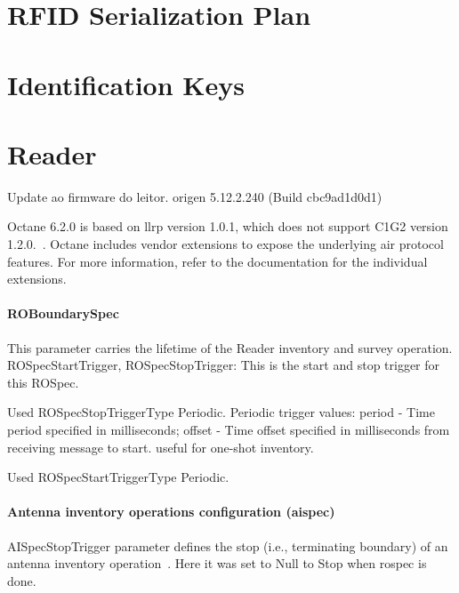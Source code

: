 \section{RFID Serialization Plan}

\section{Identification Keys}

\section{Reader}

Update ao firmware do leitor. origen 5.12.2.240 (Build cbc9ad1d0d1)


Octane 6.2.0 is based on \ac{llrp} version 1.0.1, which does not support C1G2 version 1.2.0.~\cite[sec. 3.1.21]{ImpinjOctaneLLRP}. Octane includes vendor extensions to expose the underlying air protocol features. For more information, refer to the documentation for the individual extensions.

\paragraph{ROBoundarySpec}

This parameter carries the lifetime of the Reader inventory and survey operation.
ROSpecStartTrigger, ROSpecStopTrigger: This is the start and stop trigger for this ROSpec.

Used ROSpecStopTriggerType Periodic.
Periodic trigger values: period - Time period specified in milliseconds; offset - Time offset specified in milliseconds from receiving message to start. useful for one-shot inventory.

Used ROSpecStartTriggerType Periodic.

\paragraph{Antenna inventory operations configuration (\ac{aispec})}

AISpecStopTrigger parameter defines the stop (i.e., terminating boundary) of an antenna inventory operation~\cite[sec. 11.2.2.1]{LowLevelReader}. Here it was set to Null to Stop when \ac{rospec} is done.

